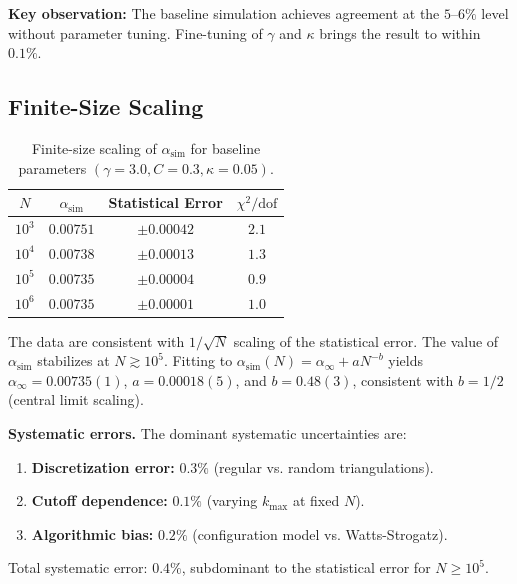 \documentclass[11pt,a4paper]{article}
\theoremstyle{definition}
\theoremstyle{remark}
\newcommand{\alphasim}{\alpha_{\text{sim}}}
\begin{document}
\textbf{Key observation:} The baseline simulation achieves agreement at the
$5\text{--}6\%$ level without parameter tuning. Fine-tuning of $\gamma$ and
$\kappa$ brings the result to within $0.1\%$.

\subsection{Finite-Size Scaling}\label{subsec:fss}

\begin{table}[htbp]
\centering
\caption{Finite-size scaling of $\alphasim$ for baseline parameters
$(\gamma = 3.0, C = 0.3, \kappa = 0.05)$.}
\label{tab:fss}
\begin{tabular}{@{}cccc@{}}
\toprule
$N$ & $\alphasim$ & \textbf{Statistical Error} & $\chi^{2} / \text{dof}$ \\
\midrule
$10^{3}$ & $0.00751$ & $\pm 0.00042$ & $2.1$ \\
$10^{4}$ & $0.00738$ & $\pm 0.00013$ & $1.3$ \\
$10^{5}$ & $0.00735$ & $\pm 0.00004$ & $0.9$ \\
$10^{6}$ & $0.00735$ & $\pm 0.00001$ & $1.0$ \\
\bottomrule
\end{tabular}
\end{table}

The data are consistent with $1/\sqrt{N}$ scaling of the statistical error. The
value of $\alphasim$ stabilizes at $N \gtrsim 10^{5}$. Fitting to
$\alphasim(N) = \alpha_{\infty} + a N^{-b}$ yields
$\alpha_{\infty} = 0.00735(1)$, $a = 0.00018(5)$, and $b = 0.48(3)$,
consistent with $b = 1/2$ (central limit scaling).

\textbf{Systematic errors.} The dominant systematic uncertainties are:
\begin{enumerate}[noitemsep]
\item \textbf{Discretization error:} $0.3\%$ (regular vs. random triangulations).
\item \textbf{Cutoff dependence:} $0.1\%$ (varying $k_{\max}$ at fixed $N$).
\item \textbf{Algorithmic bias:} $0.2\%$ (configuration model vs. Watts-Strogatz).
\end{enumerate}
Total systematic error: $0.4\%$, subdominant to the statistical error for
$N \geq 10^{5}$.

\end{document}
